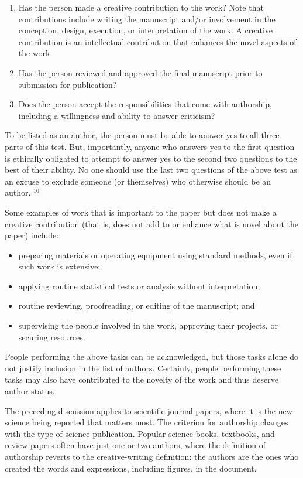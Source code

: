 \begin{enumerate}
  \item Has the person made a creative contribution to the work? Note that contributions include writing the manuscript and/or involvement in the conception, design, execution, or interpretation of the work. A creative contribution is an intellectual contribution that enhances the novel aspects of the work.

  \item Has the person reviewed and approved the final manuscript prior to submission for publication?

  \item Does the person accept the responsibilities that come with authorship, including a willingness and ability to answer criticism?

\end{enumerate}

To be listed as an author, the person must be able to answer yes to all three parts of this test. But, importantly, anyone who answers yes to the first question is ethically obligated to attempt to answer yes to the second two questions to the best of their ability. No one should use the last two questions of the above test as an excuse to exclude someone (or themselves) who otherwise should be an author. ${ }^{10}$

Some examples of work that is important to the paper but does not make a creative contribution (that is, does not add to or enhance what is novel about the paper) include:

\begin{itemize}
  \item preparing materials or operating equipment using standard methods, even if such work is extensive;
  \item applying routine statistical tests or analysis without interpretation;
  \item routine reviewing, proofreading, or editing of the manuscript; and
  \item supervising the people involved in the work, approving their projects, or securing resources.
\end{itemize}

People performing the above tasks can be acknowledged, but those tasks alone do not justify inclusion in the list of authors. Certainly, people performing these tasks may also have contributed to the novelty of the work and thus deserve author status.

The preceding discussion applies to scientific journal papers, where it is the new science being reported that matters most. The criterion for authorship changes with the type of science publication. Popular-science books, textbooks, and review papers often have just one or two authors, where the definition of authorship reverts to the creative-writing definition: the authors are the ones who created the words and expressions, including figures, in the document.


